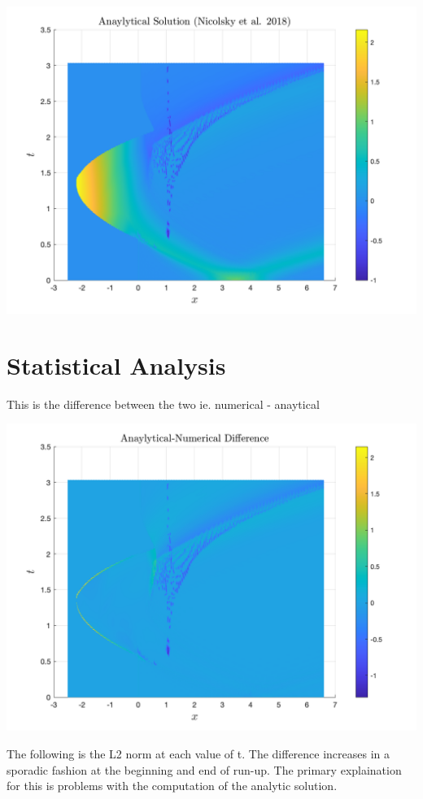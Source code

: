 \documentclass{article}
\begin{document}
\includegraphics[width=\linewidth]{ana.png}

\section{Statistical Analysis}

This is the difference between the two ie. numerical - anaytical

\includegraphics[width=\linewidth]{diff.png}

\noindent The following is the L2 norm at each value of t. The difference increases in a sporadic fashion at the beginning and end of run-up. The primary explaination for this is problems with the computation of the analytic solution.
\end{document}

